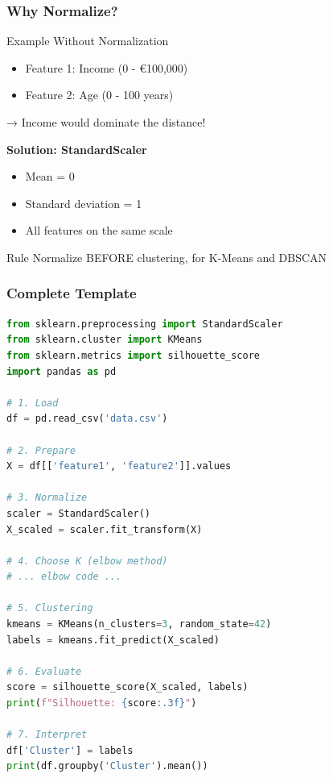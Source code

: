 \documentclass{beamer}
\begin{document}
\begin{frame}
\frametitle{Why Normalize?}
\begin{exampleblock}{Example Without Normalization}
\begin{itemize}
    \item Feature 1: Income (0 - €100,000)
    \item Feature 2: Age (0 - 100 years)
\end{itemize}
→ Income would dominate the distance!
\end{exampleblock}

\vspace{1em}
\textbf{Solution: StandardScaler}
\begin{itemize}
    \item Mean = 0
    \item Standard deviation = 1
    \item All features on the same scale
\end{itemize}

\vspace{1em}
\begin{block}{Rule}
Normalize BEFORE clustering, for K-Means and DBSCAN
\end{block}
\end{frame}

\begin{frame}[fragile]
\frametitle{Complete Template}
\begin{lstlisting}[language=Python]
from sklearn.preprocessing import StandardScaler
from sklearn.cluster import KMeans
from sklearn.metrics import silhouette_score
import pandas as pd

# 1. Load
df = pd.read_csv('data.csv')

# 2. Prepare
X = df[['feature1', 'feature2']].values

# 3. Normalize
scaler = StandardScaler()
X_scaled = scaler.fit_transform(X)

# 4. Choose K (elbow method)
# ... elbow code ...

# 5. Clustering
kmeans = KMeans(n_clusters=3, random_state=42)
labels = kmeans.fit_predict(X_scaled)

# 6. Evaluate
score = silhouette_score(X_scaled, labels)
print(f"Silhouette: {score:.3f}")

# 7. Interpret
df['Cluster'] = labels
print(df.groupby('Cluster').mean())
\end{lstlisting}
\end{frame}

\end{document}
